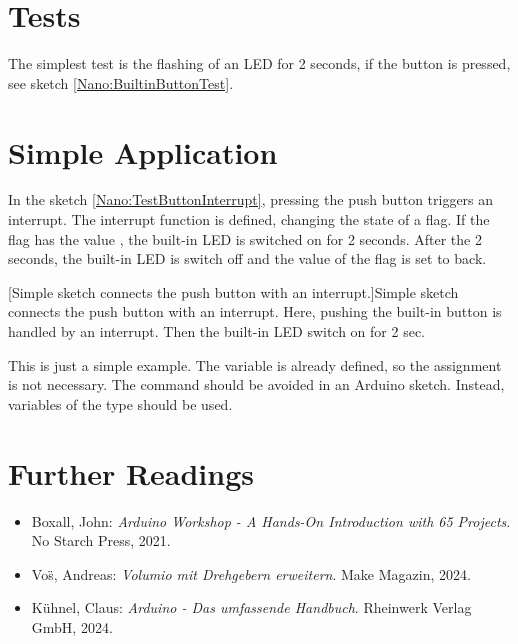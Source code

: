 \section{Tests}


The simplest test is the flashing of an LED for 2 seconds, if the button is pressed, see sketch \ref{Nano:BuiltinButtonTest}.

{
    \label{Nano:BuiltinButtonTest}
}




\section{Simple Application}


In the sketch \ref{Nano:TestButtonInterrupt}, pressing the push button triggers an interrupt. The interrupt function is defined, changing the state of a flag. If the flag has the value , the built-in LED is switched on for 2 seconds. After the 2 seconds, the built-in LED is switch off and the value of the flag is set to  back. \cite{ArduinoInterrupt:2019}


{
    [Simple sketch connects the push button with an interrupt.]{Simple sketch connects the push button with an interrupt. Here, pushing the built-in button is handled by an interrupt. Then the built-in LED switch on for 2 sec.}\label{Nano:TestButtonInterrupt}
}

\bigskip

This is just a simple example. The variable  is already defined, so the assignment is not necessary. The command  should be avoided in an Arduino sketch. Instead, variables of the type  should be used.



\section{Further Readings}

\begin{itemize}
  \item Boxall, John: \textsl{Arduino Workshop - A Hands-On Introduction with 65 Projects}. No Starch Press, 2021. \cite{Boxall:2021}
  \item Vo{\"s}, Andreas: \textsl{Volumio mit Drehgebern erweitern}. Make Magazin, 2024. \cite{Voss:2024}
  \item K\"uhnel, Claus: \textsl{Arduino - Das umfassende Handbuch}. Rheinwerk Verlag GmbH, 2024. \cite{Kuehnel:2024}
\end{itemize}

